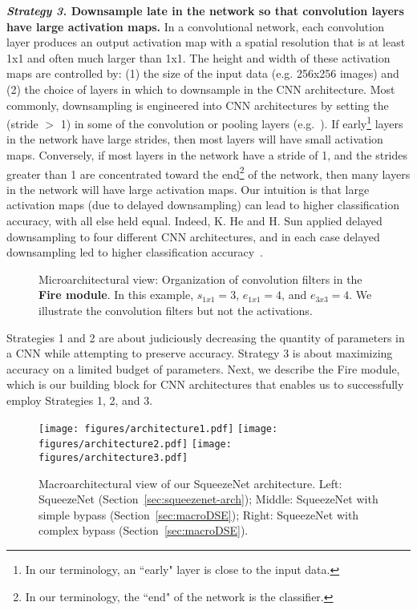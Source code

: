 \documentclass{article} \usepackage{iclr2017_conference,times}
\renewcommand{\cite}{\citep}
\begin{document}
\noindent
{\bf {\em Strategy 3.} Downsample late in the network so that convolution layers have large activation maps.}
In a convolutional network, each convolution layer produces an output activation map with a spatial resolution that is at least 1x1 and often much larger than 1x1. 
The height and width of these activation maps are controlled by: (1) the size of the input data (e.g. 256x256 images) and (2) the choice of layers in which to downsample in the CNN architecture.
Most commonly, downsampling is engineered into CNN architectures by setting the (stride $>$ 1) in some of the convolution or pooling layers (e.g.~\cite{googlenet,VGG-19,alexnet}).
If early\footnote{In our terminology, an ``early" layer is close to the input data.} layers in the network have large strides, then most layers will have small activation maps.
Conversely, if most layers in the network have a stride of 1, and the strides greater than 1 are concentrated toward the end\footnote{In our terminology, the ``end" of the network is the classifier.} of the network, then many layers in the network will have large activation maps.
Our intuition is that large activation maps (due to delayed downsampling) can lead to higher classification accuracy, with all else held equal.
Indeed, K. He and H. Sun applied delayed downsampling to four different CNN architectures, and in each case delayed downsampling led to higher classification accuracy~\cite{ConstrainedTimeCost}. 

\begin{figure}[!t]
	\centering
	\caption[Microarchitectural view of the Fire module]{Microarchitectural view: Organization of convolution filters in the {\bf Fire module}. In this example, $s_{1x1}=3$, $e_{1x1}=4$, and $e_{3x3}=4$. We illustrate the convolution filters but not the activations.}
	\label{fig:fire-module}
\end{figure}

Strategies 1 and 2 are about judiciously decreasing the quantity of parameters in a CNN while attempting to preserve accuracy.
Strategy 3 is about maximizing accuracy on a limited budget of parameters.
Next, we describe the Fire module, which is our building block for CNN architectures that enables us to successfully employ Strategies 1, 2, and 3.

\begin{figure*}[!t]
	\centering
	\texttt{[image: figures/architecture1.pdf]}
	\hspace{1em}
	\texttt{[image: figures/architecture2.pdf]}
	\hspace{5em}
	\texttt{[image: figures/architecture3.pdf]}
	\caption[Macroarchitectural view of the SqueezeNet architecture]{Macroarchitectural view of our SqueezeNet architecture. Left: SqueezeNet (Section~\ref{sec:squeezenet-arch}); Middle: SqueezeNet with simple bypass (Section~\ref{sec:macroDSE}); Right: SqueezeNet with complex bypass (Section~\ref{sec:macroDSE}).}
	\label{fig:SqueezeNet-architecture}
\end{figure*}
\end{document}
